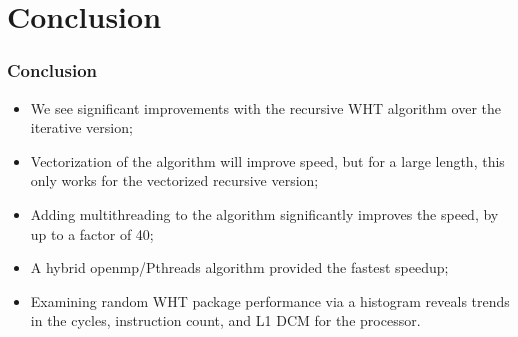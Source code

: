 \documentclass[mathserif,usenames,dvipsnames]{beamer}
\begin{document}
\section{Conclusion}
\frame %
{
    \frametitle{Conclusion}
    \begin{itemize}
        \item We see significant improvements with the recursive WHT algorithm over the iterative version;
        \item Vectorization of the algorithm will improve speed, but for a large length, this only works for the vectorized recursive version;
        \item Adding multithreading to the algorithm significantly improves the speed, by up to a factor of 40;
        \item A hybrid openmp/Pthreads algorithm provided the fastest speedup;
        \item Examining random WHT package performance via a histogram reveals trends in the cycles, instruction count, and L1 DCM for the processor.
    \end{itemize}
}
\end{document}
